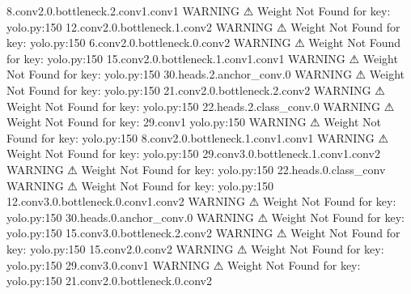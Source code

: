                              8.conv2.0.bottleneck.2.conv1.conv1                   
                    WARNING  ⚠ Weight Not Found for key:               yolo.py:150
                             12.conv2.0.bottleneck.1.conv2                        
                    WARNING  ⚠ Weight Not Found for key:               yolo.py:150
                             6.conv2.0.bottleneck.0.conv2                         
                    WARNING  ⚠ Weight Not Found for key:               yolo.py:150
                             15.conv2.0.bottleneck.1.conv1.conv1                  
                    WARNING  ⚠ Weight Not Found for key:               yolo.py:150
                             30.heads.2.anchor_conv.0                             
                    WARNING  ⚠ Weight Not Found for key:               yolo.py:150
                             21.conv2.0.bottleneck.2.conv2                        
                    WARNING  ⚠ Weight Not Found for key:               yolo.py:150
                             22.heads.2.class_conv.0                              
                    WARNING  ⚠ Weight Not Found for key: 29.conv1      yolo.py:150
                    WARNING  ⚠ Weight Not Found for key:               yolo.py:150
                             8.conv2.0.bottleneck.1.conv1.conv1                   
                    WARNING  ⚠ Weight Not Found for key:               yolo.py:150
                             29.conv3.0.bottleneck.1.conv1.conv2                  
                    WARNING  ⚠ Weight Not Found for key:               yolo.py:150
                             22.heads.0.class_conv                                
                    WARNING  ⚠ Weight Not Found for key:               yolo.py:150
                             12.conv3.0.bottleneck.0.conv1.conv2                  
                    WARNING  ⚠ Weight Not Found for key:               yolo.py:150
                             30.heads.0.anchor_conv.0                             
                    WARNING  ⚠ Weight Not Found for key:               yolo.py:150
                             15.conv3.0.bottleneck.2.conv2                        
                    WARNING  ⚠ Weight Not Found for key:               yolo.py:150
                             15.conv2.0.conv2                                     
                    WARNING  ⚠ Weight Not Found for key:               yolo.py:150
                             29.conv3.0.conv1                                     
                    WARNING  ⚠ Weight Not Found for key:               yolo.py:150
                             21.conv2.0.bottleneck.0.conv2                        
